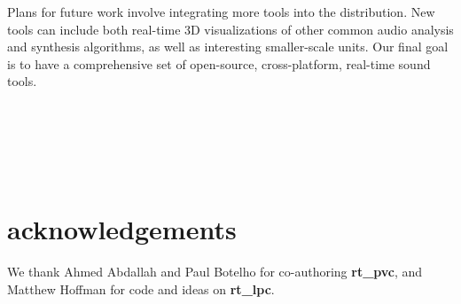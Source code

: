 \documentclass{article}
\begin{document}
Plans for future work involve integrating more tools into the distribution. New tools can include both real-time 3D visualizations of other common audio analysis and synthesis algorithms, as well as interesting smaller-scale units. Our final goal is to have a comprehensive set of open-source, cross-platform, real-time sound tools.\\\\\\\\\\\


\section{acknowledgements}

We thank Ahmed Abdallah and Paul Botelho for co-authoring {\bf rt\_pvc}, and Matthew Hoffman for code and ideas on {\bf rt\_lpc}.  
\smallskip

\smallskip
\end{document}
